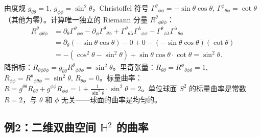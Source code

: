 由度规 $g_{\theta\theta}=1$, $g_{\phi\phi}=\sin^2\theta$，Christoffel 符号 $\Gamma^\theta{}_{\phi\phi} = -\sin\theta\cos\theta$, $\Gamma^\phi{}_{\theta\phi} = \cot\theta$（其他为零）。计算唯一独立的 Riemann 分量 $R^\theta{}_{\phi\theta\phi}$：
\begin{align}
    R^\theta{}_{\phi\theta\phi} &= \partial_\theta \Gamma^\theta{}_{\phi\phi} - \partial_\phi \Gamma^\theta{}_{\theta\phi} + \Gamma^\theta{}_{\theta\lambda}\Gamma^\lambda{}_{\phi\phi} - \Gamma^\theta{}_{\phi\lambda}\Gamma^\lambda{}_{\theta\phi} \\
    &= \partial_\theta(-\sin\theta\cos\theta) - 0 + 0 - (-\sin\theta\cos\theta)(\cot\theta) \\
    &= -(\cos^2\theta - \sin^2\theta) + \sin\theta\cos\theta \cdot \cot\theta = \sin^2\theta.
\end{align}
降指标：$R_{\theta\phi\theta\phi} = g_{\theta\theta} R^\theta{}_{\phi\theta\phi} = \sin^2\theta$。里奇张量：$R_{\theta\theta} = R^\phi{}_{\theta\phi\theta} = 1$, $R_{\phi\phi} = R^\theta{}_{\phi\theta\phi} = \sin^2\theta$, $R_{\theta\phi} = 0$。标量曲率：$R = g^{\theta\theta}R_{\theta\theta} + g^{\phi\phi}R_{\phi\phi} = 1 + \frac{1}{\sin^2\theta} \cdot \sin^2\theta = 2$。单位球面 $S^2$ 的标量曲率是常数 $R = 2$，与 $\theta$ 和 $\phi$ 无关——球面的曲率是均匀的。

\subsection{例2：二维双曲空间 $\mathbb{H}^2$ 的曲率}

